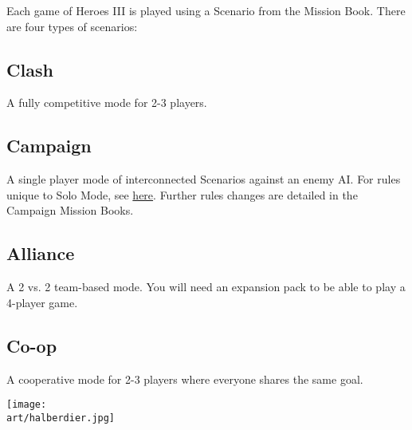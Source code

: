 
\begin{multicols*}{2}

Each game of Heroes III is played using a Scenario from the Mission Book.
There are four types of scenarios:

\subsection*{Clash}
A fully competitive mode for 2-3 players.

\subsection*{Campaign}
A single player mode of interconnected Scenarios against an enemy AI.
For rules unique to Solo Mode, see \hyperlink{AIrules}{here}.
Further rules changes are detailed in the Campaign Mission Books.

\subsection*{Alliance}
A 2 vs.
2 team-based mode.
You will need an expansion pack to be able to play a 4-player game.

\subsection*{Co-op}
A cooperative mode for 2-3 players where everyone shares the same goal.

\vspace*{\fill}

\columnbreak

\texttt{[image: \\art/halberdier.jpg]}

\end{multicols*}
